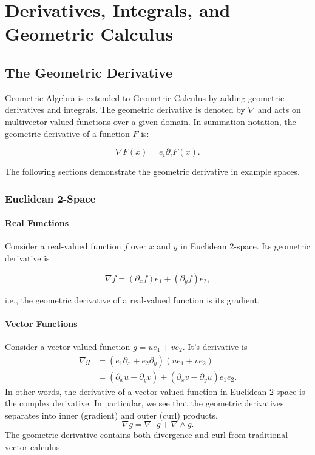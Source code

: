 \chapter{Derivatives, Integrals, and Geometric Calculus}

	\section{The Geometric Derivative}
	
	Geometric Algebra is extended to Geometric Calculus by adding geometric derivatives and integrals. The geometric derivative is denoted by $\nabla$ and acts on multivector-valued functions over a given domain. In summation notation, the geometric derivative of a function $F$ is:
	
	\[
	\nabla F\left( x\right)  = e_i\partial_i F \left( x\right).
	\]
	
	The following sections demonstrate the geometric derivative in example spaces.
	
	\subsection{Euclidean 2-Space}
	
	\subsubsection{Real Functions}
	
	Consider a real-valued function $f$ over $x$ and $y$ in Euclidean 2-space. Its geometric derivative is
	
	\[
	\nabla f = \left( \partial_x f\right) e_1  + \left( \partial_y f\right) e_2,
	\]
	
	i.e., the geometric derivative of a real-valued function is its gradient.
	
	\subsubsection{Vector Functions}
	
	Consider a vector-valued function $g = u e_1 + ve_2.$ It's derivative is
	\begin{align*}
	\nabla g & = \left(e_1\partial_x + e_2\partial_y \right) \left(ue_1 + ve_2 \right) \\
	 & = \left( \partial_x u + \partial_y v\right) + \left( \partial_x v - \partial_y u\right)e_1e_2. 
	\end{align*}	
	In other words, the derivative of a vector-valued function in Euclidean 2-space is the complex derivative. In particular, we see that the geometric derivatives separates into inner (gradient) and outer (curl) products,
	\[
	\nabla g = \nabla \cdot g + \nabla \wedge g.
	\]
	The geometric derivative contains both divergence and curl from traditional vector calculus.
	
